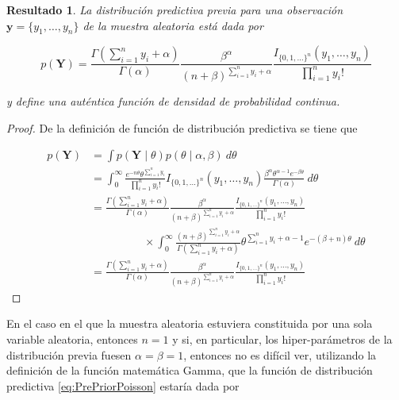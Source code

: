 \documentclass[
  10pt,
  spanish,
]{book}
\newtheorem{proposition}{Resultado}[chapter]
\theoremstyle{definition}
\theoremstyle{definition}
\theoremstyle{definition}
\theoremstyle{definition}
\theoremstyle{remark}
\begin{document}
\begin{proposition}
\protect\hypertarget{prp:unnamed-chunk-44}{}{\label{prp:unnamed-chunk-44} }La distribución predictiva previa para una observación \(\mathbf{y}=\{y_1,\ldots,y_n\}\) de la muestra aleatoria está dada por

\begin{equation}
\label{eq:PrePriorPoisson}
p(\mathbf{Y})=\frac{\Gamma(\sum_{i=1}^ny_i+\alpha)}{\Gamma(\alpha)}\frac{\beta^\alpha}{(n+\beta)^{\sum_{i=1}^ny_i+\alpha}}
\frac{I_{\{0,1,\ldots\}^n}(y_1,\ldots,y_n)}{\prod_{i=1}^ny_i!}
\end{equation}

y define una auténtica función de densidad de probabilidad continua.
\end{proposition}

\begin{proof}
{}De la definición de función de distribución predictiva se tiene que

\begin{align*}
p(\mathbf{Y})&=\int p(\mathbf{Y} \mid \theta)p(\theta \mid \alpha,\beta)\ d\theta\\
&=\int_0^{\infty} \frac{e^{-n\theta}\theta^{\sum_{i=1}^ny_i}}{\prod_{i=1}^ny_i!}I_{\{0,1,\ldots\}^n}(y_1,\ldots,y_n)
\frac{\beta^\alpha \theta^{\alpha-1} e^{-\beta\theta}}{\Gamma(\alpha)}\ d\theta\\
&=\frac{\Gamma(\sum_{i=1}^ny_i+\alpha)}{\Gamma(\alpha)}\frac{\beta^\alpha}{(n+\beta)^{\sum_{i=1}^ny_i+\alpha}}
\frac{I_{\{0,1,\ldots\}^n}(y_1,\ldots,y_n)}{\prod_{i=1}^ny_i!}\\
&\hspace{2cm}\times
\int_0^{\infty} \frac{(n+\beta)^{\sum_{i=1}^ny_i+\alpha}}{\Gamma(\sum_{i=1}^ny_i+\alpha)}
\theta^{\sum_{i=1}^ny_i+\alpha-1}e^{-(\beta+n)\theta} \ d\theta\\
&=\frac{\Gamma(\sum_{i=1}^ny_i+\alpha)}{\Gamma(\alpha)}\frac{\beta^\alpha}{(n+\beta)^{\sum_{i=1}^ny_i+\alpha}}
\frac{I_{\{0,1,\ldots\}^n}(y_1,\ldots,y_n)}{\prod_{i=1}^ny_i!}
\end{align*}
\end{proof}

En el caso en el que la muestra aleatoria estuviera constituida por una sola variable aleatoria, entonces \(n=1\) y si, en particular, los hiper-parámetros de la distribución previa fuesen \(\alpha=\beta=1\), entonces no es difícil ver, utilizando la definición de la función matemática Gamma, que la función de distribución predictiva \eqref{eq:PrePriorPoisson} estaría dada por
\end{document}
